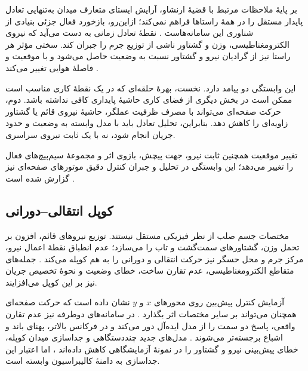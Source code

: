 بر پایهٔ ملاحظات مرتبط با قضیهٔ ارنشاو، آرایش ایستای متعارف میدان به‌تنهایی تعادل پایدار مستقل را در همهٔ راستاها فراهم نمی‌کند؛ ازاین‌رو، بازخورد فعال جزئی بنیادی از شناوری این سامانه‌هاست \cite{jansenModelingMagneticallyLevitated2007}. نقطهٔ تعادل زمانی به دست می‌آید که نیروی الکترومغناطیسی، وزن و گشتاور ناشی از توزیع جرم را جبران کند. سختی مؤثر هر راستا نیز از گرادیان نیرو و گشتاور نسبت به وضعیت حاصل می‌شود و با موقعیت و فاصلهٔ هوایی تغییر می‌کند \cite{huDynamicModelingApproach2025}.

این وابستگی دو پیامد دارد. نخست، بهرهٔ حلقه‌ای که در یک نقطهٔ کاری مناسب است ممکن است در بخش دیگری از فضای کاری حاشیهٔ پایداری کافی نداشته باشد. دوم، حرکت صفحه‌ای می‌تواند با مصرف ظرفیت عملگر، حاشیهٔ نیروی قائم یا گشتاور زاویه‌ای را کاهش دهد. بنابراین، تحلیل تعادل باید با مدل وابسته به وضعیت و حدود جریان انجام شود، نه با یک ثابت نیروی سراسری.

تغییر موقعیت همچنین ثابت نیرو، جهت پیچش، بازوی اثر و مجموعهٔ سیم‌پیچ‌های فعال را تغییر می‌دهد؛ این وابستگی در تحلیل و جبران کنترل دقیق موتورهای صفحه‌ای نیز گزارش شده است \cite{broensPrecisionControlPosition2024}.

\subsection{کوپل انتقالی--دورانی}
\label{subsec:rigid-body-coupling}

مختصات جسم صلب از نظر فیزیکی مستقل نیستند. توزیع نیروهای قائم، افزون بر تحمل وزن، گشتاورهای سمت‌گشت و تاب را می‌سازد؛ عدم انطباق نقطهٔ اعمال نیرو، مرکز جرم و محل حسگر نیز حرکت انتقالی و دورانی را به هم کوپله می‌کند \cite{jansenModelingMagneticallyLevitated2007,huDynamicModelingApproach2025}. جمله‌های متقاطع الکترومغناطیسی، عدم تقارن ساخت، خطای وضعیت و نحوهٔ تخصیص جریان نیز بر این کوپل می‌افزایند.

آزمایش کنترل پیش‌بین روی محورهای $x$ و $y$ نشان داده است که حرکت صفحه‌ای همچنان می‌تواند بر سایر مختصات اثر بگذارد \cite{xuPredictorbasedModelPredictive2023}. در سامانه‌های دوطرفه نیز عدم تقارن واقعی، پاسخ دو سمت را از مدل ایده‌آل دور می‌کند و در فرکانس بالاتر، پهنای باند و اشباع برجسته‌تر می‌شوند \cite{wangCharacteristicAnalysisDisplacement2025}. مدل‌های جدید چنددستگاهی و جداسازی میدان کوپله، خطای پیش‌بینی نیرو و گشتاور را در نمونهٔ آزمایشگاهی کاهش داده‌اند \cite{huDynamicModelingApproach2025}، اما اعتبار این جداسازی به دامنهٔ کالیبراسیون وابسته است.

